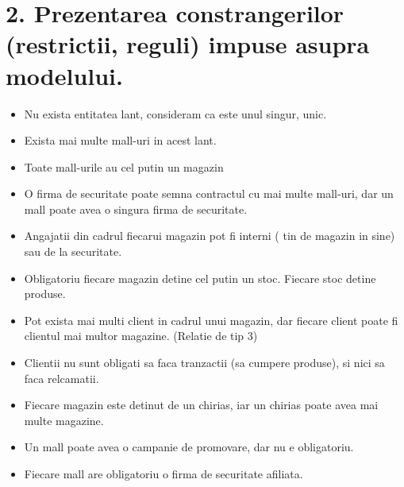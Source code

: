 
\section*{2. Prezentarea constrangerilor (restrictii, reguli) impuse asupra modelului.}
\vspace{1cm}
\begin{itemize}
    \item Nu exista entitatea lant, consideram ca este unul singur, unic.
    \item Exista mai multe mall-uri in acest lant.
    \item Toate mall-urile au cel putin un magazin
    \item O firma de securitate poate semna contractul cu mai multe mall-uri, dar un mall poate avea o singura firma de securitate.
    \item Angajatii din cadrul fiecarui magazin pot fi interni ( tin de magazin in sine) sau de la securitate.
    \item Obligatoriu fiecare magazin detine cel putin un stoc. Fiecare stoc detine produse.
    \item Pot exista mai multi client in cadrul unui magazin, dar fiecare client poate fi clientul mai multor magazine. (Relatie de tip 3)
    \item Clientii nu sunt obligati sa faca tranzactii (sa cumpere produse), si nici sa faca relcamatii.
    \item Fiecare magazin este detinut de un chirias, iar un chirias poate avea mai multe magazine.
    \item Un mall poate avea o campanie de promovare, dar nu e obligatoriu.
    \item Fiecare mall are obligatoriu o firma de securitate afiliata.
\end{itemize}
